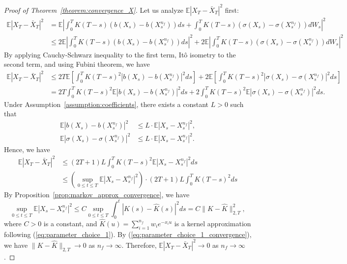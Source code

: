 \documentclass[11pt]{article}%
\theoremstyle{definition}
\begin{document}
\begin{proof}[Proof of Theorem~\ref{theorem:convergence_X}]
    Let us analyze \(\mathbb{E} |X_T - \bar{X}_T|^2\) first:
    \begin{align*}
        \mathbb{E} |X_T - \bar{X}_T|^2 &= \mathbb{E} \left|\int_{0}^{T}K(T-s) \left(b(X_s) - b(X_s^{n_f})\right)ds + \int_{0}^{T}K(T-s) \left(\sigma(X_s) - \sigma(X_s^{n_f})\right)dW_s\right|^2\\
        &\le 2\mathbb{E} \left|\int_{0}^{T}K(T-s) \left(b(X_s) - b(X_s^{n_f})\right)ds\right|^2 + 2\mathbb{E} \left|\int_{0}^{T}K(T-s) \left(\sigma(X_s) - \sigma(X_s^{n_f})\right)dW_s\right|^2
    \end{align*}
    By applying Cauchy-Schwarz inequality to the first term, It\^o isometry to the second term, and using Fubini theorem, we have
    \begin{align*}
        \mathbb{E} |X_T - \bar{X}_T|^2 &\le 2T \mathbb{E} \left[\int_{0}^{T}K(T-s)^2  \left|b(X_s) - b(X_s^{n_f})\right|^2 ds \right] 
        + 2\mathbb{E} \left[\int_{0}^{T}K(T-s)^2  \left|\sigma(X_s) - \sigma(X_s^{n_f})\right|^2 ds\right]\\
        &= 2T\int_{0}^{T} K(T-s)^2 \mathbb{E} \left|b(X_s) - b(X_s^{n_f})\right|^2 ds + 2\int_{0}^{T} K(T-s)^2 \mathbb{E} \left|\sigma(X_s) - \sigma(X_s^{n_f})\right|^2 ds.
    \end{align*}
    Under Assumption~\ref{assumption:coefficients}, there exists a constant \(L>0\) such that
    \begin{align*}
        \mathbb{E} \left|b(X_s) - b(X_s^{n_f})\right|^2 &\le L \cdot \mathbb{E} \left|X_s - X_s^{n_f}\right|^2,\\
        \mathbb{E} \left|\sigma(X_s) - \sigma(X_s^{n_f})\right|^2 &\le L\cdot \mathbb{E} \left|X_s - X_s^{n_f}\right|^2.
    \end{align*}
    Hence, we have 
    \begin{align*}
        \mathbb{E} |X_T - \bar{X}_T|^2 &\le (2T+1)L \int_{0}^{T} K(T-s)^2 \mathbb{E} \left|X_s - X_s^{n_f}\right|^2 ds\\
        &\le \left(\sup_{0\le t\le T} \mathbb{E} \left|X_s - X_s^{n_f}\right|^2 \right) \cdot (2T+1)L \int_{0}^{T} K(T-s)^2 ds
    \end{align*}
    By Proposition~\ref{prop:markov_approx_convergence}, we have 
    \[
    \sup_{0\le t\le T} \mathbb{E} \left|X_s - X_s^{n_f}\right|^2 \le C \sup_{0\le t\le T} \int_0^t |K(s) - \widehat{K}(s)|^2 ds = C \|K - \widehat{K}\|_{2,T}^2,
    \]
    where \(C>0\) is a constant, and \(\widehat{K}(u) = \sum_{i=1}^{n_f} w_i e^{-x_i u}\) is a kernel approximation following (\ref{eq:parameter_choice_1}). By (\ref{eq:parameter_choice_1_convergence}), we have \(\|K - \widehat{K}\|_{2,T} \to 0\) as \(n_f\to \infty\). Therefore, \(\mathbb{E} |X_T - \bar{X}_T|^2 \to 0\) as \(n_f\to \infty\).


\end{proof}
\end{document}
